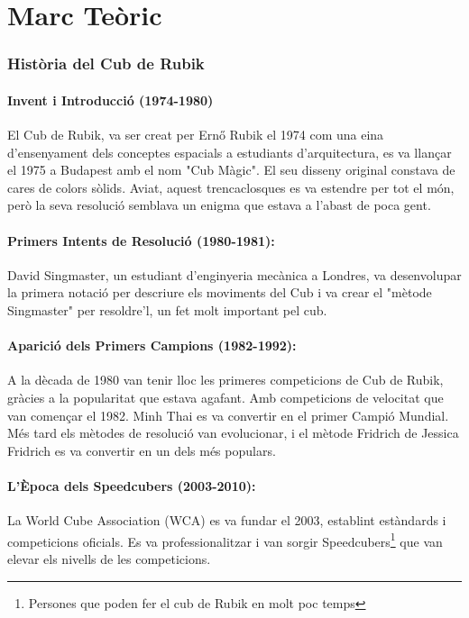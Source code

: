 \part*{Marc Teòric}
\section{Història del Cub de Rubik}

\subsection{Invent i Introducció (1974-1980)}

El Cub de Rubik, va ser creat per Ernő Rubik el 1974 com una eina d'ensenyament dels conceptes espacials a estudiants d'arquitectura, es va llançar el 1975 a Budapest amb el nom "Cub Màgic". El seu disseny original constava de cares de colors sòlids. Aviat, aquest trencaclosques es va estendre per tot el món, però la seva resolució semblava un enigma que estava a l'abast de poca gent.

\subsection{Primers Intents de Resolució (1980-1981):}

David Singmaster, un estudiant d'enginyeria mecànica a Londres, va desenvolupar la primera notació per descriure els moviments del Cub i va crear el "mètode Singmaster" per resoldre'l, un fet molt important pel cub.

\subsection{Aparició dels Primers Campions (1982-1992):}

A la dècada de 1980 van tenir lloc les primeres competicions de Cub de Rubik, gràcies a la popularitat que estava agafant. Amb competicions de velocitat que van començar el 1982. Minh Thai es va convertir en el primer Campió Mundial. Més tard els mètodes de resolució van evolucionar, i el mètode Fridrich de Jessica Fridrich es va convertir en un dels més populars.

\subsection{L'Època dels Speedcubers (2003-2010):}

La World Cube Association (WCA) es va fundar el 2003, establint estàndards i competicions oficials. Es va professionalitzar i van sorgir Speedcubers\footnote{Persones que poden fer el cub de Rubik en molt poc temps} que van elevar els nivells de les competicions.

